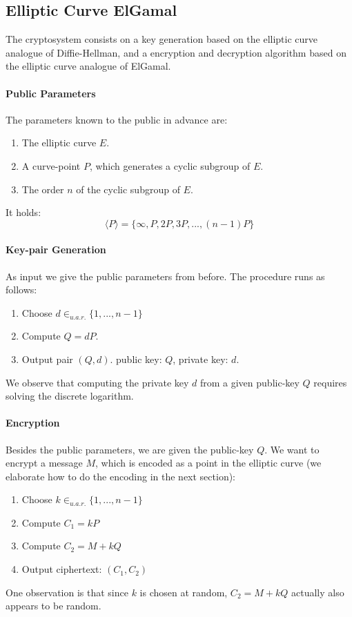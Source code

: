 \documentclass[11pt,english]{article}
\begin{document}
\subsection{Elliptic Curve ElGamal}
\label{Elliptic Curve ElGamal}
The cryptosystem consists on a key generation based on the elliptic curve analogue of Diffie-Hellman, and a encryption and decryption algorithm based on the elliptic curve analogue of ElGamal.

\paragraph{Public Parameters} The parameters known to the public in advance are:
\begin{enumerate}
 \item The elliptic curve $E$.
 \item A curve-point $P$, which generates a cyclic subgroup of $E$.
 \item The order $n$ of the cyclic subgroup of $E$.
\end{enumerate}
It holds:
\begin{displaymath}
 \langle P\rangle=\{\infty,P,2P,3P,...,(n-1)P\}
\end{displaymath}


\paragraph{Key-pair Generation}
As input we give the public parameters from before. The procedure runs as follows:
\begin{enumerate}
 \item Choose $d\in_{u.a.r.}\{1,...,n-1\}$
 \item Compute $Q=dP$.
 \item Output pair $(Q,d)$. public key: $Q$, private key: $d$.
\end{enumerate}
We observe that computing the private key $d$ from a given public-key $Q$ requires solving the discrete logarithm.

\paragraph{Encryption}
Besides the public parameters, we are given the public-key $Q$. We want to encrypt a message $M$, which is encoded as a point in the elliptic curve (we elaborate how to do the encoding in the next section):
\begin{enumerate}
\item Choose $k\in_{u.a.r.}\{1,...,n-1\}$
\item Compute $C_1=kP$
\item Compute $C_2=M+kQ$
\item Output ciphertext: $(C_1,C_2)$
\end{enumerate}
One observation is that since $k$ is chosen at random, $C_2=M+kQ$ actually also appears to be random.
\end{document}
